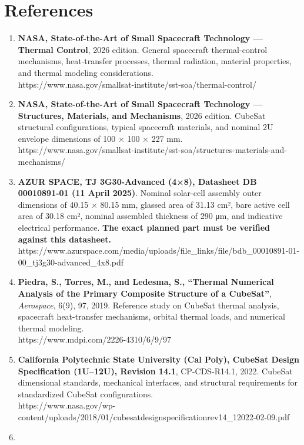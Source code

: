 \documentclass[
]{book}
\begin{document}
\section{References}\label{references}

\begin{enumerate}
\def\labelenumi{\arabic{enumi}.}
\item
  \textbf{NASA, State-of-the-Art of Small Spacecraft Technology --- Thermal Control}, 2026 edition. General spacecraft thermal-control mechanisms, heat-transfer processes, thermal radiation, material properties, and thermal modeling considerations.\\
  https://www.nasa.gov/smallsat-institute/sst-soa/thermal-control/
\item
  \textbf{NASA, State-of-the-Art of Small Spacecraft Technology --- Structures, Materials, and Mechanisms}, 2026 edition. CubeSat structural configurations, typical spacecraft materials, and nominal 2U envelope dimensions of 100 × 100 × 227 mm.\\
  https://www.nasa.gov/smallsat-institute/sst-soa/structures-materials-and-mechanisms/
\item
  \textbf{AZUR SPACE, TJ 3G30-Advanced (4×8), Datasheet DB 00010891-01 (11 April 2025)}. Nominal solar-cell assembly outer dimensions of 40.15 × 80.15 mm, glassed area of 31.13 cm², bare active cell area of 30.18 cm², nominal assembled thickness of 290 μm, and indicative electrical performance. \textbf{The exact planned part must be verified against this datasheet.}\\
  https://www.azurspace.com/media/uploads/file\_links/file/bdb\_00010891-01-00\_tj3g30-advanced\_4x8.pdf
\item
  \textbf{Piedra, S., Torres, M., and Ledesma, S., ``Thermal Numerical Analysis of the Primary Composite Structure of a CubeSat''}, \emph{Aerospace}, 6(9), 97, 2019. Reference study on CubeSat thermal analysis, spacecraft heat-transfer mechanisms, orbital thermal loads, and numerical thermal modeling.\\
  https://www.mdpi.com/2226-4310/6/9/97
\item
  \textbf{California Polytechnic State University (Cal Poly), CubeSat Design Specification (1U--12U), Revision 14.1}, CP-CDS-R14.1, 2022. CubeSat dimensional standards, mechanical interfaces, and structural requirements for standardized CubeSat configurations.\\
  https://www.nasa.gov/wp-content/uploads/2018/01/cubesatdesignspecificationrev14\_12022-02-09.pdf
\item

\end{enumerate}
\end{document}

